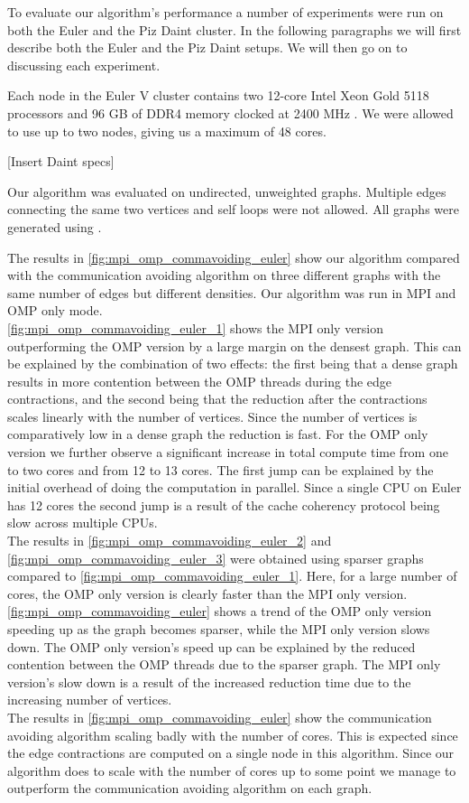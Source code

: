 To evaluate our algorithm's performance a number of experiments were run on both the Euler and the Piz Daint cluster. In the following paragraphs we will first describe both the Euler and the Piz Daint setups. We will then go on to discussing each experiment.

Each node in the Euler V cluster contains two 12-core Intel Xeon Gold 5118 processors and 96 GB of DDR4 memory clocked at 2400 MHz \cite{Euler}. We were allowed to use up to two nodes, giving us a maximum of 48 cores.

 [Insert Daint specs]

Our algorithm was evaluated on undirected, unweighted graphs. Multiple edges connecting the same two vertices and self loops were not allowed. All graphs were generated using \cite{Parmat}.

The results in \autoref{fig:mpi_omp_commavoiding_euler} show our algorithm compared with the communication avoiding algorithm \cite{comm_avoiding} on three different graphs with the same number of edges but different densities. Our algorithm was run in MPI and OMP only mode.\\
\autoref{fig:mpi_omp_commavoiding_euler_1} shows the MPI only version outperforming the OMP version by a large margin on the densest graph. This can be explained by the combination of two effects: the first being that a dense graph results in more contention between the OMP threads during the edge contractions, and the second being that the reduction after the contractions scales linearly with the number of vertices. Since the number of vertices is comparatively low in a dense graph the reduction is fast. For the OMP only version we further observe a significant increase in total compute time from one to two cores and from 12 to 13 cores. The first jump can be explained by the initial overhead of doing the computation in parallel. Since a single CPU on Euler has 12 cores the second jump is a result of the cache coherency protocol being slow across multiple CPUs.\\
The results in \autoref{fig:mpi_omp_commavoiding_euler_2} and \autoref{fig:mpi_omp_commavoiding_euler_3} were obtained using sparser graphs compared to \autoref{fig:mpi_omp_commavoiding_euler_1}. Here, for a large number of cores, the OMP only version is clearly faster than the MPI only version. \autoref{fig:mpi_omp_commavoiding_euler} shows a trend of the OMP only version speeding up as the graph becomes sparser, while the MPI only version slows down. The OMP only version's speed up can be explained by the reduced contention between the OMP threads due to the sparser graph. The MPI only version's slow down is a result of the increased reduction time due to the increasing number of vertices.\\
The results in \autoref{fig:mpi_omp_commavoiding_euler} show the communication avoiding algorithm scaling badly with the number of cores. This is expected since the edge contractions are computed on a single node in this algorithm. Since our algorithm does to scale with the number of cores up to some point we manage to outperform the communication avoiding algorithm on each graph.

